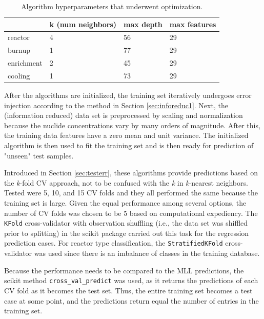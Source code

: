 \begin{table}[!hbt]
  \centering
  \begin{tabular}{@{}llll@{}}
  \toprule
             & k (num neighbors) & max depth & max features \\ \midrule
  reactor    & 4                 & 56        & 29           \\
  burnup     & 1                 & 77        & 29           \\
  enrichment & 2                 & 45        & 29           \\
  cooling    & 1                 & 73        & 29           \\ \bottomrule
  \end{tabular}
  \caption{Algorithm hyperparameters that underwent optimization.}
  \label{tbl:exp1hypparam}
\end{table}

After the algorithms are initialized, the training set iteratively undergoes
error injection according to the method in Section \ref{sec:inforeduc1}. Next,
the (information reduced) data set is preprocessed by scaling and normalization
because the nuclide concentrations vary by many orders of magnitude. After
this, the training data features have a zero mean and unit variance. The
initialized algorithm is then used to fit the training set and is then ready
for prediction of "unseen" test samples.

Introduced in Section \ref{sec:testerr}, these algorithms provide predictions
based on the \textit{k}-fold \gls{CV} approach, not to be confused with the
\textit{k} in \textit{k}-nearest neighbors.  Tested were 5, 10, and 15 \gls{CV}
folds and they all performed the same because the training set is large.  Given
the equal performance among several options, the number of \gls{CV} folds was
chosen to be 5 based on computational expediency. The \texttt{KFold}
cross-validator with observation shuffling (i.e., the data set was shiffled
prior to splitting) in the scikit package carried out this task for the
regression prediction cases.  For reactor type classification, the
\texttt{StratifiedKFold} cross-validator was used since there is an imbalance
of classes in the training database.   

Because the performance needs to be compared to the \gls{MLL} predictions, the
scikit method \texttt{cross\_val\_predict} was used, as it returns the
predictions of each \gls{CV} fold as it becomes the test set. Thus, the entire
training set becomes a test case at some point, and the predictions return
equal the number of entries in the training set.

